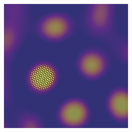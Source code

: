 \documentclass[showkeys, prb, reprint]{revtex4-1}
\begin{document}
\begin{figure}
\begin{subfigure}[b]{0.2\textwidth}
        \label{fig:devel_spinodal}
        \caption{}
    \end{subfigure}
    ~
    \begin{subfigure}[b]{0.2\textwidth}
        \includegraphics[width=\textwidth]{nucleation}
        \label{fig:nucleation}
        \caption{}
    \end{subfigure}
    

\end{figure}
\end{document}
